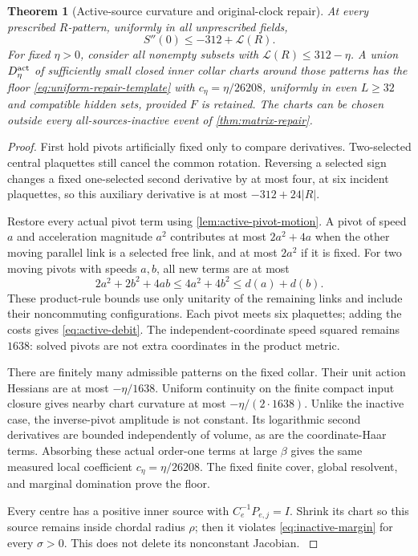 \documentclass[11pt,oneside,openany]{book}
\newtheorem{theorem}{Theorem}[chapter]
\theoremstyle{definition}
\theoremstyle{remark}
\newcommand{\src}[2]{\cite[#2]{#1}}
\begin{document}
\begin{theorem}[Active-source curvature and original-clock repair]
\label{thm:active-repair}
At every prescribed $R$-pattern, uniformly in all unprescribed fields,
\[
 S''(0)\le-312+\mathcal L(R).
\]
For fixed $\eta>0$, consider all nonempty subsets with
$\mathcal L(R)\le312-\eta$. A union $D_\eta^{\rm act}$ of sufficiently
small closed inner collar charts around those patterns has the floor
\cref{eq:uniform-repair-template} with $c_\eta=\eta/26208$, uniformly
in even $L\ge32$ and compatible hidden sets, provided $F$ is retained.
The charts can be chosen outside every all-sources-inactive event of
\cref{thm:matrix-repair}.
\end{theorem}
\begin{proof}
First hold pivots artificially fixed only to compare derivatives.
Two-selected central plaquettes still cancel the common rotation.
Reversing a selected sign changes a fixed one-selected second
derivative by at most four, at six incident plaquettes, so this
auxiliary derivative is at most $-312+24|R|$.

Restore every actual pivot term using \cref{lem:active-pivot-motion}.
A pivot of speed $a$ and acceleration magnitude $a^2$ contributes at
most $2a^2+4a$ when the other moving parallel link is a selected free
link, and at most $2a^2$ if it is fixed. For two moving pivots with
speeds $a,b$, all new terms are at most
\[
 2a^2+2b^2+4ab\le4a^2+4b^2\le d(a)+d(b).
\]
These product-rule bounds use only unitarity of the remaining links
and include their noncommuting configurations. Each pivot meets six
plaquettes; adding the costs gives \cref{eq:active-debit}. The
independent-coordinate speed squared remains $1638$: solved pivots
are not extra coordinates in the product metric.

There are finitely many admissible patterns on the fixed collar.
Their unit action Hessians are at most $-\eta/1638$. Uniform continuity
on the finite compact input closure gives nearby chart curvature at
most $-\eta/(2\cdot1638)$. Unlike the inactive case, the inverse-pivot
amplitude is not constant. Its logarithmic second derivatives are
bounded independently of volume, as are the coordinate-Haar terms.
Absorbing these actual order-one terms at large $\beta$ gives the same
measured local coefficient $c_\eta=\eta/26208$. The fixed finite
cover, global resolvent, and marginal domination prove the floor.

Every centre has a positive inner source with $C_e^{-1}P_{e,j}=I$.
Shrink its chart so this source remains inside chordal radius $\rho$;
then it violates \cref{eq:inactive-margin} for every $\sigma>0$.
This does not delete its nonconstant Jacobian. \src{F13}{V17}
\end{proof}
\end{document}
